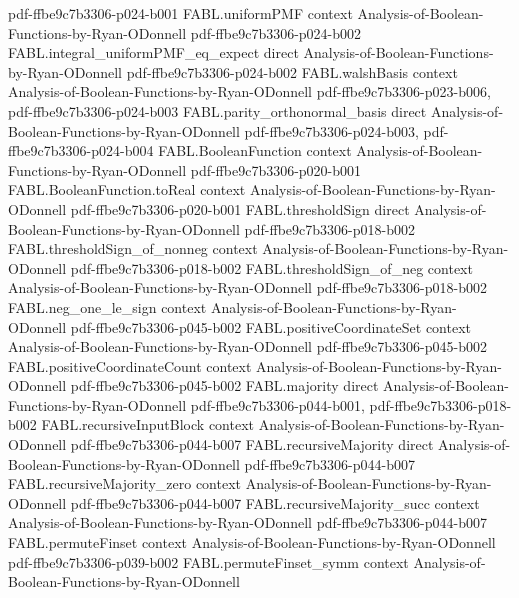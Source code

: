 \begin{theorem}
  {pdf-ffbe9c7b3306-p024-b001}
\proofstep
  {FABL.uniformPMF}
  {context}
  {Analysis-of-Boolean-Functions-by-Ryan-ODonnell}
  {pdf-ffbe9c7b3306-p024-b002}
\proofstep
  {FABL.integral_uniformPMF_eq_expect}
  {direct}
  {Analysis-of-Boolean-Functions-by-Ryan-ODonnell}
  {pdf-ffbe9c7b3306-p024-b002}
\proofstep
  {FABL.walshBasis}
  {context}
  {Analysis-of-Boolean-Functions-by-Ryan-ODonnell}
  {pdf-ffbe9c7b3306-p023-b006,
    pdf-ffbe9c7b3306-p024-b003}
\proofstep
  {FABL.parity_orthonormal_basis}
  {direct}
  {Analysis-of-Boolean-Functions-by-Ryan-ODonnell}
  {pdf-ffbe9c7b3306-p024-b003,
    pdf-ffbe9c7b3306-p024-b004}
\proofstep
  {FABL.BooleanFunction}
  {context}
  {Analysis-of-Boolean-Functions-by-Ryan-ODonnell}
  {pdf-ffbe9c7b3306-p020-b001}
\proofstep
  {FABL.BooleanFunction.toReal}
  {context}
  {Analysis-of-Boolean-Functions-by-Ryan-ODonnell}
  {pdf-ffbe9c7b3306-p020-b001}
\proofstep
  {FABL.thresholdSign}
  {direct}
  {Analysis-of-Boolean-Functions-by-Ryan-ODonnell}
  {pdf-ffbe9c7b3306-p018-b002}
\proofstep
  {FABL.thresholdSign_of_nonneg}
  {context}
  {Analysis-of-Boolean-Functions-by-Ryan-ODonnell}
  {pdf-ffbe9c7b3306-p018-b002}
\proofstep
  {FABL.thresholdSign_of_neg}
  {context}
  {Analysis-of-Boolean-Functions-by-Ryan-ODonnell}
  {pdf-ffbe9c7b3306-p018-b002}
\proofstep
  {FABL.neg_one_le_sign}
  {context}
  {Analysis-of-Boolean-Functions-by-Ryan-ODonnell}
  {pdf-ffbe9c7b3306-p045-b002}
\proofstep
  {FABL.positiveCoordinateSet}
  {context}
  {Analysis-of-Boolean-Functions-by-Ryan-ODonnell}
  {pdf-ffbe9c7b3306-p045-b002}
\proofstep
  {FABL.positiveCoordinateCount}
  {context}
  {Analysis-of-Boolean-Functions-by-Ryan-ODonnell}
  {pdf-ffbe9c7b3306-p045-b002}
\proofstep
  {FABL.majority}
  {direct}
  {Analysis-of-Boolean-Functions-by-Ryan-ODonnell}
  {pdf-ffbe9c7b3306-p044-b001,
    pdf-ffbe9c7b3306-p018-b002}
\proofstep
  {FABL.recursiveInputBlock}
  {context}
  {Analysis-of-Boolean-Functions-by-Ryan-ODonnell}
  {pdf-ffbe9c7b3306-p044-b007}
\proofstep
  {FABL.recursiveMajority}
  {direct}
  {Analysis-of-Boolean-Functions-by-Ryan-ODonnell}
  {pdf-ffbe9c7b3306-p044-b007}
\proofstep
  {FABL.recursiveMajority_zero}
  {context}
  {Analysis-of-Boolean-Functions-by-Ryan-ODonnell}
  {pdf-ffbe9c7b3306-p044-b007}
\proofstep
  {FABL.recursiveMajority_succ}
  {context}
  {Analysis-of-Boolean-Functions-by-Ryan-ODonnell}
  {pdf-ffbe9c7b3306-p044-b007}
\proofstep
  {FABL.permuteFinset}
  {context}
  {Analysis-of-Boolean-Functions-by-Ryan-ODonnell}
  {pdf-ffbe9c7b3306-p039-b002}
\proofstep
  {FABL.permuteFinset_symm}
  {context}
  {Analysis-of-Boolean-Functions-by-Ryan-ODonnell}

\end{theorem}
